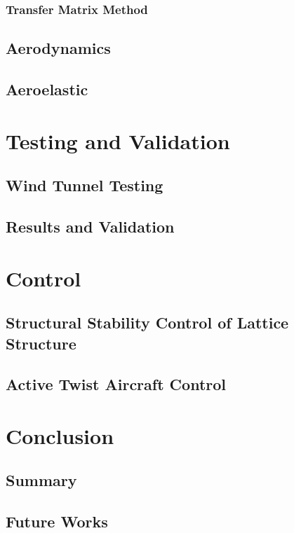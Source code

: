 \documentclass[11pt]{ucthesis}
\begin{document}
\subsection{Transfer Matrix Method}

\section{Aerodynamics}

\section{Aeroelastic}

\chapter{Testing and Validation}
\section{Wind Tunnel Testing}
\section{Results and Validation}

\chapter{Control}
\section{Structural Stability Control of Lattice Structure}

\section{Active Twist Aircraft Control}

\chapter{Conclusion}
\section{Summary}
\section{Future Works}

\nocite{*}


\end{document}
